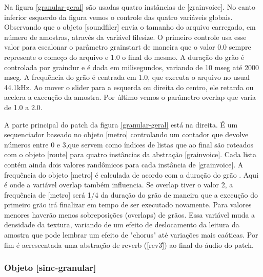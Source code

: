 \documentclass[draft]{ppgmus}
\begin{document}
Na figura \ref{granular-geral} são usadas quatro instâncias de [grainvoice]. No canto inferior esquerdo da figura
vemos o controle das quatro variáveis globais. Observando que o objeto [soundfiler] envia o tamanho do arquivo
carregado, em número de amostras, através da variável filesize. O primeiro controle usa esse valor para escalonar
o parâmetro grainstart de maneira que o valor 0.0 sempre represente o começo do arquivo e 1.0 o final do mesmo.
A duração do grão é controlada por graindur e é dada em milisegundos, variando de 10 mseg até 2000 mseg.
A frequẽncia do grão é centrada em 1.0, que executa o arquivo no usual 44.1kHz. Ao mover o slider para a esquerda
ou direita do centro, ele retarda ou acelera a execução da amostra. Por último vemos o parâmetro overlap que varia de
1.0 a 2.0.

A parte principal do patch da figura \ref{granular-geral} está na direita. É um sequenciador baseado no objeto
[metro] controlando um contador que devolve números entre 0 e 3,que servem como índices de listas que ao final
são roteados com o objeto [route] para quatro instâncias da abstração [grainvoice]. Cada lista contém ainda dois
valores randômicos para cada instância de [grainvoice]. A frequência do objeto [metro] é calculada de acordo com a duração
do grão . Aqui é onde a variável
overlap também influencia. Se overlap tiver o valor 2, a frequência de [metro] será 1/4 da duração
do grão de maneira que a execução do primeiro grão irá finalizar em tempo de ser executado novamente.
Para valores menores haverão menos sobreposições (overlaps) de grãos. Essa variável muda a densidade da
textura, variando de um efeito de deslocamento da leitura da amostra que pode lembrar um efeito de 
"chorus" até variações mais caóticas. Por fim é acrescentada uma abstração de reverb ([rev3\~]) ao final
do áudio do patch.



\subsubsection{Objeto [sinc-granular]}



\end{document}
